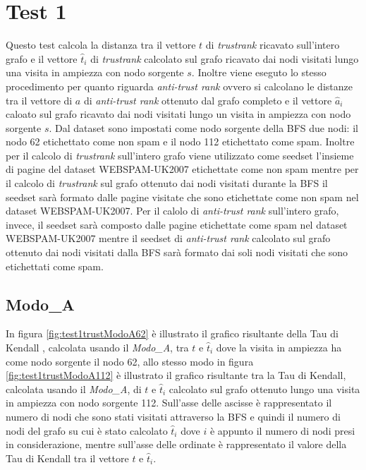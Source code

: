  \section{Test 1}
 Questo test calcola la distanza tra il vettore \(t\) di \textit{trustrank} ricavato sull'intero grafo e il vettore \(\hat{t}_i\) di \textit{trustrank} calcolato sul grafo ricavato dai nodi visitati lungo una visita in ampiezza con nodo sorgente \(s\). Inoltre viene eseguto lo stesso procedimento per quanto riguarda \textit{anti-trust rank} ovvero si calcolano le distanze tra il vettore di \(a\) di \textit{anti-trust rank} ottenuto dal grafo completo e il vettore \(\hat{a}_i\)  caloato sul grafo ricavato dai nodi visitati lungo  un visita in ampiezza con nodo sorgente \(s\). Dal dataset sono impostati come nodo sorgente della BFS due nodi: il nodo 62 etichettato come non spam e il nodo 112 etichettato come spam. Inoltre per il calcolo di \textit{trustrank} sull'intero grafo viene utilizzato come seedset l'insieme di pagine del dataset WEBSPAM-UK2007 etichettate come non spam mentre per il calcolo di \textit{trustrank} sul grafo ottenuto dai nodi visitati durante la BFS il seedset sarà formato dalle pagine 
visitate che sono etichettate come non spam nel dataset WEBSPAM-UK2007. Per il calolo di \textit{anti-trust rank} sull'intero grafo, invece, il seedset sarà composto dalle pagine etichettate come spam nel dataset WEBSPAM-UK2007 mentre il seedset di \textit{anti-trust rank} calcolato sul grafo ottenuto dai nodi visitati dalla BFS sarà formato dai soli nodi visitati che sono etichettati come spam.
 \subsection{Modo\_A}

 In figura \ref{fig:test1trustModoA62} è illustrato il grafico risultante della Tau di Kendall , calcolata usando il \textit{Modo\_A}, tra \(t\) e \(\hat{t}_i\) dove la visita in ampiezza ha come nodo sorgente il nodo 62, allo stesso modo in figura \ref{fig:test1trustModoA112} è illustrato il grafico risultante tra la Tau di Kendall, calcolata usando il \textit{Modo\_A}, di \(t\) e \(\hat{t}_i\) calcolato sul grafo ottenuto lungo una visita in ampiezza con nodo sorgente 112. Sull'asse delle ascisse è rappresentato il numero di nodi che sono stati visitati attraverso la BFS e quindi il numero di nodi del grafo su cui è stato calcolato \(\hat{t}_i\) dove \(i\) è appunto il numero di nodi presi in considerazione, mentre sull'asse delle ordinate è rappresentato il valore della Tau di Kendall tra il vettore \(t\) e \(\hat{t}_i\).
 
